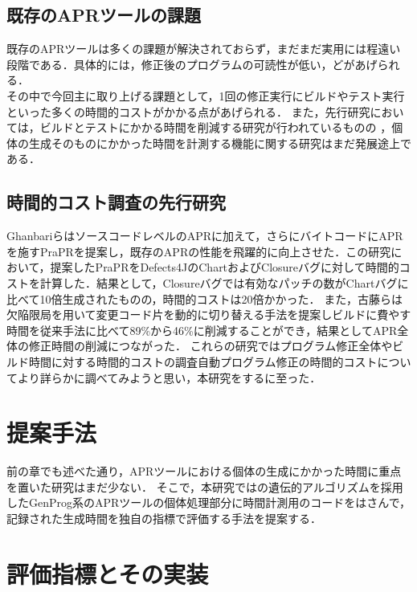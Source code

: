 \documentclass[uplatex,dvipdfmx,a4paper]{jsarticle}
\let\oldcite\cite
\renewcommand{\cite}[1]{\xspace\oldcite{#1}}
\begin{document}
\subsection{既存のAPRツールの課題} \label{sec:prev_challenge}
既存のAPRツールは多くの課題が解決されておらず\cite{le2013current}，まだまだ実用には程遠い段階である．具体的には，修正後のプログラムの可読性が低い\cite{smith2015cure}，どがあげられる．\\
その中で今回主に取り上げる課題として，1回の修正実行にビルドやテスト実行といった多くの時間的コストがかかる点\cite{chen2017contract}があげられる．
また，先行研究においては，ビルドとテストにかかる時間を削減する研究が行われているものの\cite{id692}
，個体の生成そのものにかかった時間を計測する機能に関する研究はまだ発展途上である．
\subsection{時間的コスト調査の先行研究}
Ghanbari\cite{ghanbari2019practical}らはソースコードレベルのAPRに加えて，さらにバイトコードにAPRを施すPraPRを提案し，既存のAPRの性能を飛躍的に向上させた．この研究において，提案したPraPRをDefects4JのChartおよびClosureバグに対して時間的コストを計算した．結果として，Closureバグでは有効なパッチの数がChartバグに比べて10倍生成されたものの，時間的コストは20倍かかった．
また，古藤\cite{id692}らは欠陥限局を用いて変更コード片を動的に切り替える手法を提案しビルドに費やす時間を従来手法に比べて89\%から46\%に削減することができ，結果としてAPR全体の修正時間の削減につながった．
これらの研究ではプログラム修正全体やビルド時間に対する時間的コストの調査自動プログラム修正の時間的コストについてより詳らかに調べてみようと思い，本研究をするに至った．
\clearpage
\section{提案手法} \label{sec:sgst}
前の章でも述べた通り，APRツールにおける個体の生成にかかった時間に重点を置いた研究はまだ少ない．
そこで，本研究ではの遺伝的アルゴリズムを採用したGenProg\cite{le2011genprog}系のAPRツールの個体処理部分に時間計測用のコードをはさんで，記録された生成時間を独自の指標で評価する手法を提案する．
\clearpage
\section{評価指標とその実装} \label{sec:prop}
\end{document}
